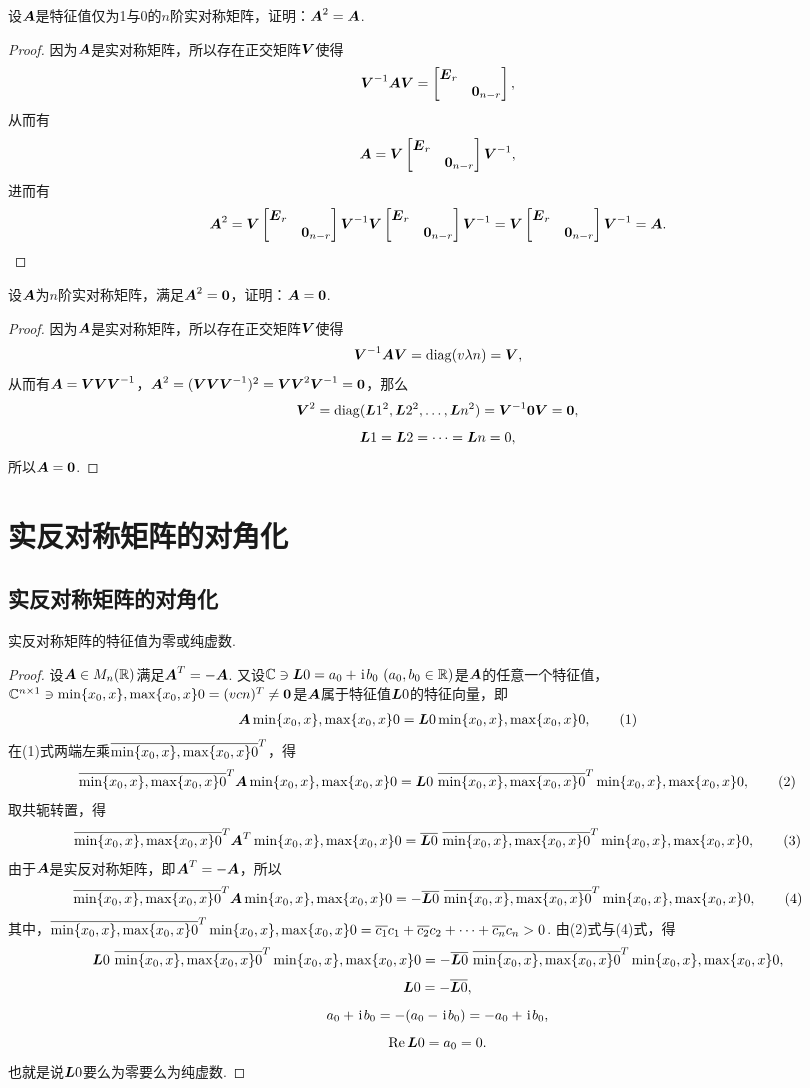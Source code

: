 \begin{example}
设\(\boldsymbol{A}\)是特征值仅为1与0的\(n\)阶实对称矩阵，证明：\(\boldsymbol{A}^2=\boldsymbol{A}\).
\begin{proof}
\def\M{\begin{bmatrix} \E_r \\ & \z_{n-r} \end{bmatrix}}%
因为\(\boldsymbol{A}\)是实对称矩阵，所以存在正交矩阵\(\Q\)使得\[
\Q^{-1}\A\Q = \M,
\]从而有\[
\A = \Q\M\Q^{-1},
\]进而有\[
\A^2 = \Q\M\Q^{-1}\Q\M\Q^{-1} = \Q\M\Q^{-1} = \A.
\qedhere
\]
\end{proof}
\end{example}

\begin{example}
设\(\boldsymbol{A}\)为\(n\)阶实对称矩阵，满足\(\boldsymbol{A}^2=\boldsymbol{0}\)，证明：\(\boldsymbol{A}=\boldsymbol{0}\).
\begin{proof}
因为\(\boldsymbol{A}\)是实对称矩阵，所以存在正交矩阵\(\Q\)使得\[
\Q^{-1}\A\Q = \diag(\v{\lambda}{n}) = \V,
\]从而有\(\A = \Q\V\Q^{-1}\)，\(\A^2 = (\Q\V\Q^{-1})^2 = \Q\V^2\Q^{-1} = \z\)，那么\[
\V^2 = \diag(\L{1}^2,\L{2}^2,\dotsc,\L{n}^2) = \Q^{-1}\z\Q = \z,
\]\[
\boldsymbol{L}{1}=\boldsymbol{L}{2}=\dotsb=\boldsymbol{L}{n} = 0,
\]所以\(\boldsymbol{A}=\boldsymbol{0}\).
\end{proof}
\end{example}

\section{实反对称矩阵的对角化}
\subsection{实反对称矩阵的对角化}
\begin{theorem}
实反对称矩阵的特征值为零或纯虚数.
\begin{proof}
设\(\boldsymbol{A} \in M_n(\mathbb{R})\)满足\(\boldsymbol{A}^T=-\boldsymbol{A}\).
又设\(\mathbb{C} \ni \L0 = a_0 + \iu b_0\ (a_0,b_0 \in \mathbb{R})\)是\(\boldsymbol{A}\)的任意一个特征值，\(\mathbb{C}^{n \times 1} \ni \min\{x_0,x\},\max\{x_0,x\}0=(v{c}{n})^T \neq \boldsymbol{0}\)是\(\boldsymbol{A}\)属于特征值\(\boldsymbol{L}0\)的特征向量，即\begin{gather}
\A\X0 = \L0\X0, \tag1
\end{gather}在(1)式两端左乘\(\overline{\min\{x_0,x\},\max\{x_0,x\}0}^T\)，得\begin{gather}
\overline{\X0}^T \A \X0
= \L0\ \overline{\X0}^T \X0, \tag2
\end{gather}
取共轭转置，得\begin{gather}
\overline{\X0}^T \A^T \X0
= \overline{\L0}\ \overline{\X0}^T \X0, \tag3
\end{gather}
由于\(\boldsymbol{A}\)是实反对称矩阵，即\(\boldsymbol{A}^T = -\boldsymbol{A}\)，所以\begin{gather}
\overline{\X0}^T \A \X0
= -\overline{\L0}\ \overline{\X0}^T \X0, \tag4
\end{gather}其中，\(\overline{\min\{x_0,x\},\max\{x_0,x\}0}^T \min\{x_0,x\},\max\{x_0,x\}0 = \overline{c_1}c_1 + \overline{c_2}c_2 + \dotsb + \overline{c_n}{c_n} > 0\).
由(2)式与(4)式，得\[
\boldsymbol{L}0\ \overline{\min\{x_0,x\},\max\{x_0,x\}0}^T \min\{x_0,x\},\max\{x_0,x\}0
= -\overline{\boldsymbol{L}0}\ \overline{\min\{x_0,x\},\max\{x_0,x\}0}^T \min\{x_0,x\},\max\{x_0,x\}0,
\]\[
\boldsymbol{L}0 = -\overline{\boldsymbol{L}0},
\]\[
a_0 + \kern1pt\mathrm{i}\kern1pt b_0 = -(a_0 - \kern1pt\mathrm{i}\kern1pt b_0) = -a_0 + \kern1pt\mathrm{i}\kern1pt b_0,
\]\[
\Re \boldsymbol{L}0 = a_0 = 0.
\]
也就是说\(\boldsymbol{L}0\)要么为零要么为纯虚数.
\end{proof}
\end{theorem}

